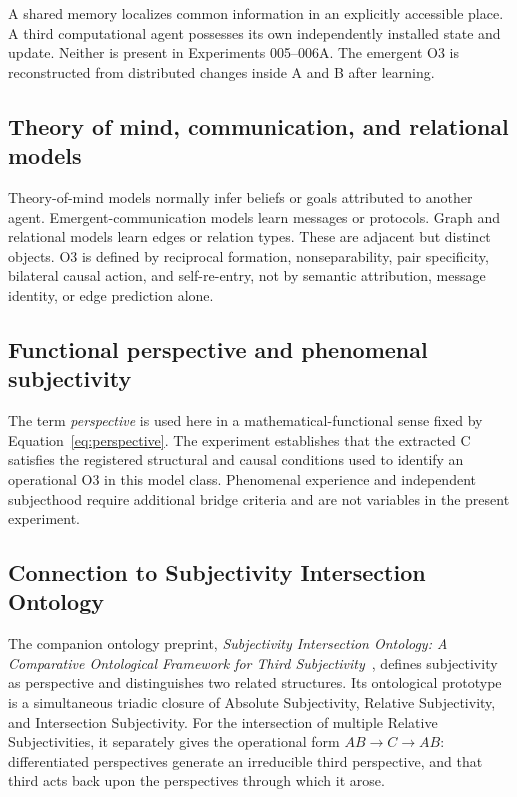 \documentclass[11pt,a4paper]{article}
\begin{document}
A shared memory localizes common information in an explicitly accessible place. A third computational agent possesses its own independently installed state and update. Neither is present in Experiments 005--006A. The emergent O3 is reconstructed from distributed changes inside A and B after learning.

\subsection{Theory of mind, communication, and relational models}

Theory-of-mind models normally infer beliefs or goals attributed to another agent. Emergent-communication models learn messages or protocols. Graph and relational models learn edges or relation types. These are adjacent but distinct objects. O3 is defined by reciprocal formation, nonseparability, pair specificity, bilateral causal action, and self-re-entry, not by semantic attribution, message identity, or edge prediction alone.

\subsection{Functional perspective and phenomenal subjectivity}

The term \emph{perspective} is used here in a mathematical-functional sense fixed by Equation~\eqref{eq:perspective}. The experiment establishes that the extracted C satisfies the registered structural and causal conditions used to identify an operational O3 in this model class. Phenomenal experience and independent subjecthood require additional bridge criteria and are not variables in the present experiment.

\subsection{Connection to Subjectivity Intersection Ontology}

The companion ontology preprint, \emph{Subjectivity Intersection Ontology: A Comparative Ontological Framework for Third Subjectivity}~\cite{watanabe2026sio}, defines subjectivity as perspective and distinguishes two related structures. Its ontological prototype is a simultaneous triadic closure of Absolute Subjectivity, Relative Subjectivity, and Intersection Subjectivity. For the intersection of multiple Relative Subjectivities, it separately gives the operational form $AB\rightarrow C\rightarrow AB$: differentiated perspectives generate an irreducible third perspective, and that third acts back upon the perspectives through which it arose.
\end{document}
